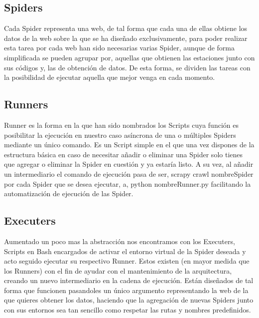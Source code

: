 \subsection{Spiders}
Cada Spider representa una web, de tal forma que cada una de ellas obtiene los datos de la web sobre la que se ha diseñado exclusivamente, para poder realizar esta tarea por cada web han sido necesarias varias Spider, aunque de forma simplificada se pueden agrupar por, aquellas que obtienen las estaciones junto con sus códigos y, las de obtención de datos. De esta forma, se dividen las tareas con la posibilidad de ejecutar aquella que mejor venga en cada momento.

\subsection{Runners}
Runner es la forma en la que han sido nombrados los Scripts cuya función es posibilitar la ejecución en nuestro caso asíncrona de una o múltiples Spiders mediante un único comando. Es un Script simple en el que una vez dispones de la estructura básica en caso de necesitar añadir o eliminar una Spider solo tienes que agregar o eliminar la Spider en cuestión y ya estaría listo.\newline
\newline
A su vez, al añadir un intermediario el comando de ejecución pasa de ser, scrapy crawl nombreSpider por cada Spider que se desea ejecutar, a, python nombreRunner.py facilitando la automatización de ejecución de las Spider.

\subsection{Executers}
Aumentado un poco mas la abstracción nos encontramos con los Executers, Scripts en Bash encargados de activar el entorno virtual de la Spider deseada y acto seguido ejecutar su respectivo Runner.\newline
\newline
Estos existen (en mayor medida que los Runners) con el fin de ayudar con el mantenimiento de la arquitectura, creando un nuevo intermediario en la cadena de ejecución.\newline
\newline
Están diseñados de tal forma que funcionen pasandoles un único argumento representando la web de la que quieres obtener los datos, haciendo que la agregación de nuevas Spiders junto con sus entornos sea tan sencillo como respetar las rutas y nombres predefinidos.

